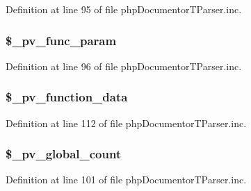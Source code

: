 \-Definition at line 95 of file php\-Documentor\-T\-Parser.\-inc.

\hypertarget{classphp_documentor_t_parser_aaadc4ebf8cb7e8344a601180785dbb67}{
\subsubsection[{\$\-\_\-pv\-\_\-func\-\_\-param}]{\setlength{\rightskip}{0pt plus 5cm}\$\-\_\-pv\-\_\-func\-\_\-param}}\label{classphp_documentor_t_parser_aaadc4ebf8cb7e8344a601180785dbb67}


\-Definition at line 96 of file php\-Documentor\-T\-Parser.\-inc.

\hypertarget{classphp_documentor_t_parser_a2ee59569de2a32df0567b5b776d1970e}{
\subsubsection[{\$\-\_\-pv\-\_\-function\-\_\-data}]{\setlength{\rightskip}{0pt plus 5cm}\$\-\_\-pv\-\_\-function\-\_\-data}}\label{classphp_documentor_t_parser_a2ee59569de2a32df0567b5b776d1970e}


\-Definition at line 112 of file php\-Documentor\-T\-Parser.\-inc.

\hypertarget{classphp_documentor_t_parser_a2c4d1d75683450c5d5530aedcfca4ac2}{
\subsubsection[{\$\-\_\-pv\-\_\-global\-\_\-count}]{\setlength{\rightskip}{0pt plus 5cm}\$\-\_\-pv\-\_\-global\-\_\-count}}\label{classphp_documentor_t_parser_a2c4d1d75683450c5d5530aedcfca4ac2}


\-Definition at line 101 of file php\-Documentor\-T\-Parser.\-inc.

